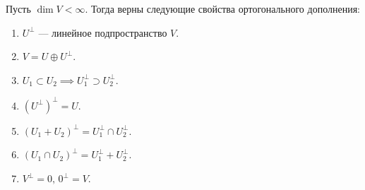 \documentclass[../main.tex]{subfiles}
\begin{document}
\begin{theorem-non}
\label{non:8.6}
  Пусть $\dim V < \infty$. Тогда верны следующие свойства ортогонального дополнения:
  \begin{enumerate}
    \item $U^\perp$ --- линейное подпространство $V$.
    \item $V = U \oplus U^\perp$.
    \item $U_1 \subset U_2 \implies U_1^\perp \supset U_2^\perp$.
    \item $(U^\perp)^\perp = U$.
    \item $(U_1 + U_2)^\perp = U_1^\perp \cap U_2^\perp$.
    \item $(U_1 \cap U_2)^\perp = U_1^\perp + U_2^\perp$.
    \item $V^\perp = 0,\, 0^\perp = V$.
  \end{enumerate}
\end{theorem-non}
\end{document}

